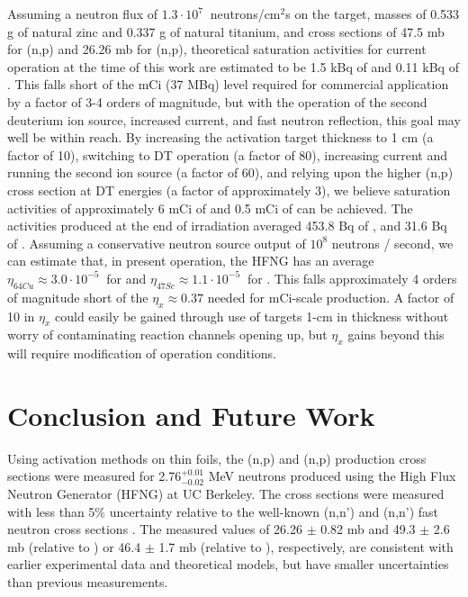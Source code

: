 \documentclass[5p]{elsarticle}
\newcommand{\sci}[2]{ #1 \cdot 10^{#2}\ }
\begin{document}
Assuming a neutron flux of  $\sci{1.3}{7}$ neutrons/cm$^2$s on the target, masses of 0.533 g of natural zinc and 0.337 g of natural titanium, and cross sections of 47.5 mb for (n,p)   and 26.26  mb for  (n,p), theoretical saturation activities for current operation at the time of this work are estimated to be 1.5 kBq of  and 0.11 kBq of .
This falls short of the mCi (37 MBq) level required for commercial application by a factor of 3-4 orders of magnitude, but with the operation of the second deuterium ion source, increased current, and fast neutron reflection, this goal may  well be within reach. 
By increasing the activation target thickness to 1 cm (a factor of 10), switching to DT operation (a factor of 80), increasing current and running the second ion source (a factor of 60), and relying upon the higher (n,p) cross section at DT energies (a factor of approximately 3), we believe saturation activities of approximately 6 mCi of  and 0.5 mCi of  can be achieved.  
The activities produced at the end of irradiation averaged 453.8 Bq of , and 31.6 Bq of .
Assuming a conservative neutron source output of $10^8$ neutrons / second, we can estimate that, in present operation, the HFNG has an average $\eta_{64Cu} \approx \sci{3.0}{-5}$ for  and $\eta_{47Sc} \approx \sci{1.1}{-5}$ for  . 
This falls approximately 4 orders of magnitude short of the $\eta_x \approx 0.37$ needed for mCi-scale production.
A factor of 10 in $\eta_x$ could easily be gained through use of targets  1-cm in thickness without worry of contaminating reaction channels opening up, but $\eta_x$ gains beyond this will require modification of operation conditions.   
 
 
 
 \section{Conclusion and Future Work}

Using activation methods on thin foils, the (n,p) and (n,p) production cross sections were measured for  2.76$^{+0.01}_{-0.02}$ MeV neutrons produced using the High Flux Neutron Generator (HFNG) at UC Berkeley.
The cross sections were measured with less than  5\% uncertainty relative to the well-known (n,n') and (n,n') fast neutron cross sections \cite{Capote2012,zsolnay2012technical}.
The measured values of  26.26 $\pm$  0.82 mb and  49.3 $\pm$ 2.6 mb (relative to ) or 46.4 $\pm$ 1.7 mb (relative to ), respectively, are consistent with earlier experimental data and theoretical models, but have smaller uncertainties than previous measurements.
 
\end{document}
